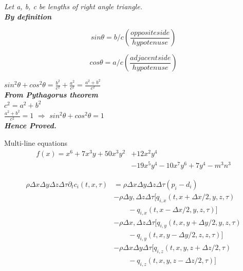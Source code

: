 \documentclass{beamer}[10pt]
\begin{document}
\begin{frame}
\begin{theorem}
\textit{Let a, b, c be lengths of right angle triangle.}\\
\textbf{\textit{By definition}}

$$sin\theta = b/c\left(\frac{oppositeside}{hypotenuse}\right)$$

$$cos\theta = a/c\left(\frac{adjacentside}{hypotenuse}\right)$$

$sin^2\theta + cos^2\theta = \frac{b^2}{c^2} + \frac{a^2}{c^2} = \frac{a^2+b^2}{c^2} $ \\
\bigskip
\textbf{\textit{From Pythagorus theorem}} \\
\bigskip
$c^2 = a^2 + b^2$ \\
\bigskip
$\frac{a^2+b^2}{c^2} = 1$ $\Longrightarrow$ $sin^2\theta + cos^2\theta = 1$ \\
\bigskip
\textbf{\textit{Hence Proved.}}
    
\end{theorem}

\end{frame}

\begin{frame}{Multi-line equations}
\transblindshorizontal
\begin{align*}
    f(x) = x^6 + 7x^3y + 50x^3y^2 & + 12x^2y^4 \\
                                  &- 19x^5y^4 - 10x^7y^6 + 7y^4 - m^3n^3
\end{align*}


\begin{align*}
\rho \Delta x \Delta y \Delta z \Delta \tau \partial_t c_i(t,x,\tau) 
& = \rho \Delta x \Delta y \Delta z \Delta \tau (p_i-d_i)  \\
& - \rho \Delta y, \Delta z \Delta \tau [q_{i,x}(t,x+\Delta x/2, y, z, \tau)\\
& \qquad - q_{i,x}(t,x - \Delta x/2, y, z, \tau)]\\
& - \rho \Delta x, \Delta z \Delta  \tau [q_{i,y}(t,x,y+\Delta y/2, y, z, \tau)\\
& \qquad - q_{i,y}(t,x,y - \Delta y/2, z, z, \tau)]\\
& - \rho \Delta x \Delta y \Delta \tau[q_{i,z}(t,x,y,z+\Delta z/2, \tau) \\
& \qquad - q_{i,z}(t,x,y,z-\Delta z/2, \tau)]
\end{align*}
\end{frame}
\end{document}
